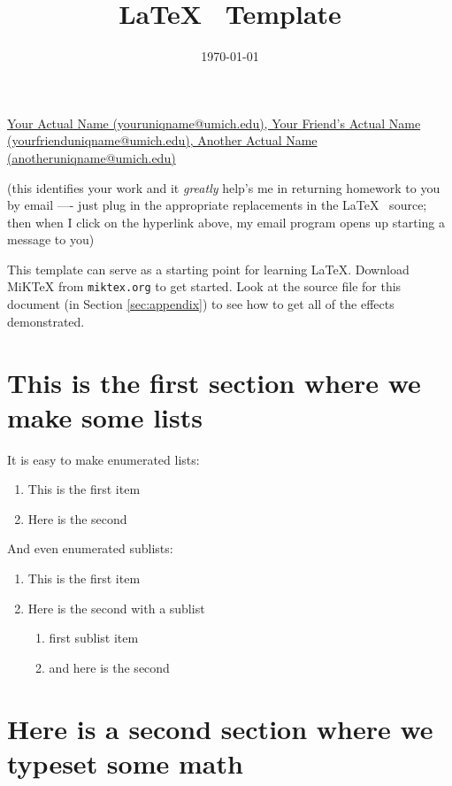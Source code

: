 \documentclass{amsart}
\theoremstyle{definition}
\theoremstyle{remark}
\numberwithin{equation}{section}
\begin{document}
\title{\LaTeX~ Template}

\date{\today}

\maketitle

 \href{mailto:youruniqname@umich.edu,yourfrienduniqname@umich.edu,anotheruniqname@umich.edu}
{Your Actual Name (youruniqname@umich.edu), 
Your Friend's Actual Name (yourfrienduniqname@umich.edu), 
Another Actual Name (anotheruniqname@umich.edu)}

\medskip

(this identifies your work and it \emph{greatly} help's me in returning homework to you by email
---- just plug in the appropriate replacements in the \LaTeX~ source; then when I click on the 
hyperlink above, my email program opens up starting a message to you)

\bigskip


This template can serve as a starting point for learning \LaTeX. Download MiKTeX from
{\tt miktex.org}
to get started. Look at the source file for this
document (in Section \ref{sec:appendix})
to see how to get all of the effects demonstrated.

\section{This is the first section where we make some lists}

It is easy to make enumerated lists:
\begin{enumerate}
\item This is the first item
\item Here is the second
\end{enumerate}

And even enumerated sublists:
\begin{enumerate}
\item This is the first item
\item Here is the second with a sublist
\begin{enumerate}
\item first sublist item
\item and here is the second
\end{enumerate}
\end{enumerate}

\section{Here is a second section where we typeset some math}
\end{document}

